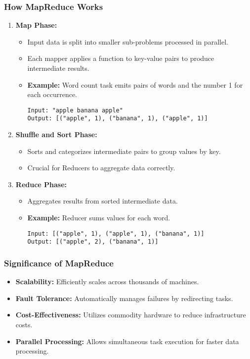 \documentclass[aspectratio=169]{beamer}
\begin{document}
\begin{frame}[fragile]
    \frametitle{How MapReduce Works}
    \begin{enumerate}
        \item \textbf{Map Phase:}
        \begin{itemize}
            \item Input data is split into smaller sub-problems processed in parallel.
            \item Each mapper applies a function to key-value pairs to produce intermediate results.
            \item \textbf{Example:} Word count task emits pairs of words and the number 1 for each occurrence. 
            \begin{verbatim}
Input: "apple banana apple"
Output: [("apple", 1), ("banana", 1), ("apple", 1)]
            \end{verbatim}
        \end{itemize}
        
        \item \textbf{Shuffle and Sort Phase:}
        \begin{itemize}
            \item Sorts and categorizes intermediate pairs to group values by key.
            \item Crucial for Reducers to aggregate data correctly.
        \end{itemize}
        
        \item \textbf{Reduce Phase:}
        \begin{itemize}
            \item Aggregates results from sorted intermediate data.
            \item \textbf{Example:} Reducer sums values for each word.
            \begin{verbatim}
Input: [("apple", 1), ("apple", 1), ("banana", 1)]
Output: [("apple", 2), ("banana", 1)]
            \end{verbatim}
        \end{itemize}
    \end{enumerate}
\end{frame}

\begin{frame}[fragile]
    \frametitle{Significance of MapReduce}
    \begin{itemize}
        \item \textbf{Scalability:} Efficiently scales across thousands of machines.
        \item \textbf{Fault Tolerance:} Automatically manages failures by redirecting tasks.
        \item \textbf{Cost-Effectiveness:} Utilizes commodity hardware to reduce infrastructure costs.
        \item \textbf{Parallel Processing:} Allows simultaneous task execution for faster data processing.
    \end{itemize}
\end{frame}
\end{document}
